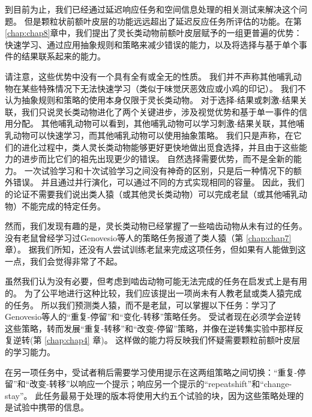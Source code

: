到目前为止，我们已经通过延迟响应任务和空间信息处理的相关测试来解决这个问题。
但是颗粒状前额叶皮层的功能远远超出了延迟反应任务所评估的功能。在第\ref{chap:chap8}章中，我们提出了灵长类动物前额叶皮层赋予的一组更普遍的优势：快速学习、通过应用抽象规则和策略来减少错误的能力，以及将选择与基于单个事件的结果联系起来的能力。
\par


请注意，这些优势中没有一个具有全有或全无的性质。
我们并不声称其他哺乳动物在某些特殊情况下无法快速学习（类似于味觉厌恶效应或小鸡的印记）。
我们不认为抽象规则和策略的使用本身仅限于灵长类动物。
对于选择-结果或刺激-结果关联，我们只说灵长类动物进化了两个关键进步，涉及视觉优势和基于单一事件的信用分配。
其他哺乳动物可以看到，其他哺乳动物可以学习刺激-结果关联，其他哺乳动物可以快速学习，而其他哺乳动物可以使用抽象策略。
我们只是声称，在它们的进化过程中，类人灵长类动物能够更好更快地做出觅食选择，并且由于这些能力的进步而比它们的祖先出现更少的错误。
自然选择需要优势，而不是全新的能力。
一次试验学习和十次试验学习之间没有神奇的区别，只是后一种情况下的额外错误。
并且通过并行演化，可以通过不同的方式实现相同的容量。
因此，我们的论证不需要我们说出类人猿（或其他灵长类动物）可以完成老鼠（或其他哺乳动物）不能完成的特定任务。
\par


然而，我们发现有趣的是，灵长类动物已经掌握了一些啮齿动物从未有过的任务。没有老鼠曾经学习过Genovesio等人的策略任务\cite{genovesio2005prefrontal}报道了类人猿（第 \ref{chap:chap7} 章）。
据我们所知，还没有人尝试训练老鼠来完成这项任务，但如果有人能做到这一点，我们会觉得非常了不起。
\par


虽然我们认为没有必要，但考虑到啮齿动物可能无法完成的任务在启发式上是有用的。
为了公平地进行这种比较，我们应该提出一项尚未有人教老鼠或类人猿完成的任务。
所以我们预测类人猿，而不是老鼠，可以掌握以下任务：学习了 Genovesio等人\cite{genovesio2005prefrontal}的“重复-停留”和“变化-转移”策略任务。
受试者现在必须学会逆转这些策略，转而发展“重复-转移”和“改变-停留”策略，并像在逆转集实验中那样反复逆转(第 \ref{chap:chap4} 章)。
这样做的能力将反映我们怀疑需要颗粒前额叶皮层的学习能力。
\par


在另一项任务中，受试者稍后需要学习使用提示在这两组策略之间切换：“重复-停留”和“改变-转移”以响应一个提示；响应另一个提示的“repeatshift”和“change-stay”。
此任务最易于处理的版本将使用大约五个试验的块，因为这些策略处理的是试验中携带的信息。
\par


